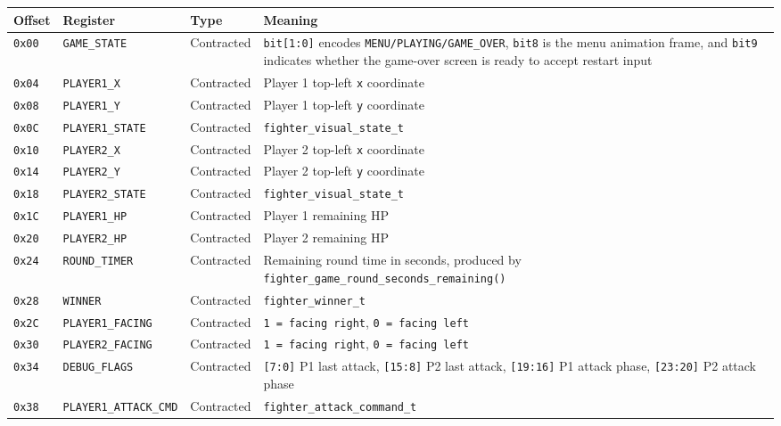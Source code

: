 \documentclass[12pt,a4paper]{article}
\begin{document}
\begin{longtable}{>{\raggedright\arraybackslash}p{} >{\raggedright\arraybackslash}p{} >{\raggedright\arraybackslash}p{} >{\raggedright\arraybackslash}p{}}
\toprule
Offset & Register & Type & Meaning \\
\midrule
\endhead
\texttt{0x00} & \texttt{GAME\_STATE} & Contracted & \texttt{bit[1:0]} encodes \texttt{MENU/PLAYING/GAME\_OVER}, \texttt{bit8} is the menu animation frame, and \texttt{bit9} indicates whether the game-over screen is ready to accept restart input \\
\texttt{0x04} & \texttt{PLAYER1\_X} & Contracted & Player 1 top-left \texttt{x} coordinate \\
\texttt{0x08} & \texttt{PLAYER1\_Y} & Contracted & Player 1 top-left \texttt{y} coordinate \\
\texttt{0x0C} & \texttt{PLAYER1\_STATE} & Contracted & \texttt{fighter\_visual\_state\_t} \\
\texttt{0x10} & \texttt{PLAYER2\_X} & Contracted & Player 2 top-left \texttt{x} coordinate \\
\texttt{0x14} & \texttt{PLAYER2\_Y} & Contracted & Player 2 top-left \texttt{y} coordinate \\
\texttt{0x18} & \texttt{PLAYER2\_STATE} & Contracted & \texttt{fighter\_visual\_state\_t} \\
\texttt{0x1C} & \texttt{PLAYER1\_HP} & Contracted & Player 1 remaining HP \\
\texttt{0x20} & \texttt{PLAYER2\_HP} & Contracted & Player 2 remaining HP \\
\texttt{0x24} & \texttt{ROUND\_TIMER} & Contracted & Remaining round time in seconds, produced by \texttt{fighter\_game\_round\_seconds\_remaining()} \\
\texttt{0x28} & \texttt{WINNER} & Contracted & \texttt{fighter\_winner\_t} \\
\texttt{0x2C} & \texttt{PLAYER1\_FACING} & Contracted & \texttt{1 = facing right}, \texttt{0 = facing left} \\
\texttt{0x30} & \texttt{PLAYER2\_FACING} & Contracted & \texttt{1 = facing right}, \texttt{0 = facing left} \\
\texttt{0x34} & \texttt{DEBUG\_FLAGS} & Contracted & \texttt{[7:0]} P1 last attack, \texttt{[15:8]} P2 last attack, \texttt{[19:16]} P1 attack phase, \texttt{[23:20]} P2 attack phase \\
\texttt{0x38} & \texttt{PLAYER1\_ATTACK\_CMD} & Contracted & \texttt{fighter\_attack\_command\_t} \\

\end{longtable}
\end{document}

